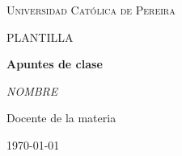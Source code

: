 \documentclass[a4paper]{report} %
\begin{document}
  \begin{titlepage}
    \centering
    {\scshape\LARGE Universidad Católica de Pereira\par}
    \vfill
    {\scshape\LARGE PLANTILLA\par}
    \vfill
    {\huge\bfseries Apuntes de clase\par}
    \vfill
    {\Large\itshape NOMBRE\par}
    \vfill
    Docente de la materia\par
	   \textsc{}
    \vfill
    {\Large\today\par}
  \end{titlepage}
  \tableofcontents %
    \part{}
      \chapter{}
        \section{}
          \subsection{} 
            \paragraph{}\mbox{} \\
        \section{}
          \subsection{}
            \paragraph{}\mbox{} \\
              
    \part{}
\end{document}
